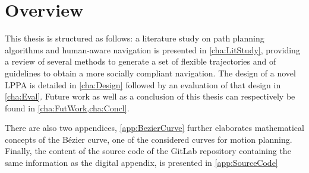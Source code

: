 \section{Overview} \label{sec:overview}
This thesis is structured as follows: a literature study on path planning algorithms and human-aware navigation is presented in \cref{cha:LitStudy}, providing a review of several methods to generate a set of flexible trajectories and of guidelines to obtain a more socially compliant navigation. The design of a novel LPPA is detailed in \cref{cha:Design} followed by an evaluation of that design in \cref{cha:Eval}. Future work as well as a conclusion of this thesis can respectively be found in \cref{cha:FutWork,cha:Concl}.

There are also two appendices, \cref{app:BezierCurve} further elaborates mathematical concepts of the Bézier curve, one of the considered curves for motion planning. Finally, the content of the source code of the GitLab repository \cite{Denis2017} containing the same information as the digital appendix, is presented in \cref{app:SourceCode}